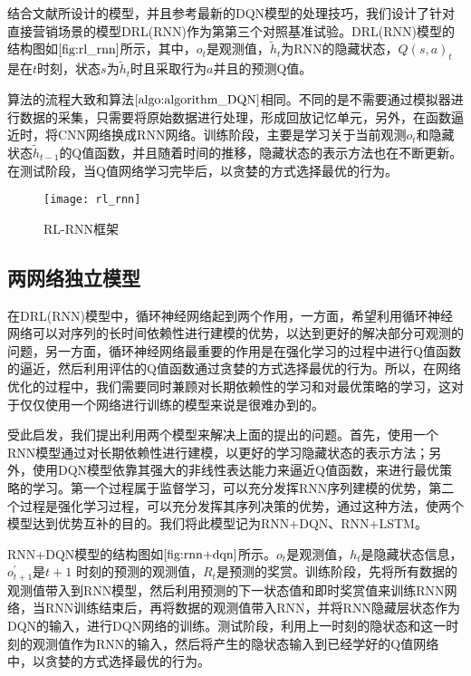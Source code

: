 结合文献\citep{hausknecht2015deep,narasimhan2015language}所设计的模型，并且参考最新的DQN模型的处理技巧，我们设计了针对直接营销场景的模型DRL(RNN)作为第第三个对照基准试验。DRL(RNN)模型的结构图如$\ref{fig:rl_rnn}$所示，其中，$o_{t}$是观测值，$\tilde{h}_{t}$为RNN的隐藏状态，$Q(s,a)_{t}$是在$t$时刻，状态$s$为$\tilde{h}_{t}$时且采取行为$a$并且的预测Q值。

算法的流程大致和算法$\ref{algo:algorithm_DQN}$相同。不同的是不需要通过模拟器进行数据的采集，只需要将原始数据进行处理，形成回放记忆单元，另外，在函数逼近时，将CNN网络换成RNN网络。训练阶段，主要是学习关于当前观测$o_{t}$和隐藏状态$\tilde{h}_{t-1}$的Q值函数，并且随着时间的推移，隐藏状态的表示方法也在不断更新。在测试阶段，当Q值网络学习完毕后，以贪婪的方式选择最优的行为。

\begin{figure}[htbp]
\centering
\texttt{[image: rl\_rnn]}
\caption{RL-RNN框架}
\label{fig:rl_rnn}
\end{figure}

\subsection{两网络独立模型}
在DRL(RNN)模型中，循环神经网络起到两个作用，一方面，希望利用循环神经网络可以对序列的长时间依赖性进行建模的优势，以达到更好的解决部分可观测的问题，另一方面，循环神经网络最重要的作用是在强化学习的过程中进行Q值函数的逼近，然后利用评估的Q值函数通过贪婪的方式选择最优的行为。所以，在网络优化的过程中，我们需要同时兼顾对长期依赖性的学习和对最优策略的学习，这对于仅仅使用一个网络进行训练的模型来说是很难办到的。

受此启发，我们提出利用两个模型来解决上面的提出的问题。首先，使用一个RNN模型通过对长期依赖性进行建模，以更好的学习隐藏状态的表示方法；另外，使用DQN模型依靠其强大的非线性表达能力来逼近Q值函数，来进行最优策略的学习。第一个过程属于监督学习，可以充分发挥RNN序列建模的优势，第二个过程是强化学习过程，可以充分发挥其序列决策的优势，通过这种方法，使两个模型达到优势互补的目的。我们将此模型记为RNN+DQN、RNN+LSTM。

RNN+DQN模型的结构图如$\ref{fig:rnn+dqn}$所示。$o_{t}$是观测值，$h_{t}$是隐藏状态信息，$o_{t+1}^{'}$是$t+1$ 时刻的预测的观测值，$R_{t}$是预测的奖赏。训练阶段，先将所有数据的观测值带入到RNN模型，然后利用预测的下一状态值和即时奖赏值来训练RNN网络，当RNN训练结束后，再将数据的观测值带入RNN，并将RNN隐藏层状态作为DQN的输入，进行DQN网络的训练。测试阶段，利用上一时刻的隐状态和这一时刻的观测值作为RNN的输入，然后将产生的隐状态输入到已经学好的Q值网络中，以贪婪的方式选择最优的行为。

